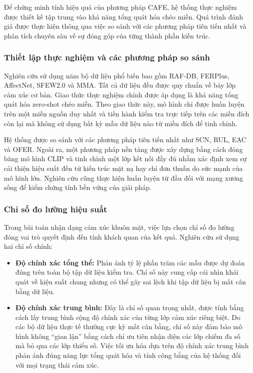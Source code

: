 Để chứng minh tính hiệu quả của phương pháp CAFE, hệ thống thực nghiệm được thiết kế tập trung vào khả năng tổng quát hóa chéo miền. Quá trình đánh giá được thực hiện thông qua việc so sánh với các phương pháp tiên tiến nhất và phân tích chuyên sâu về sự đóng góp của từng thành phần kiến trúc.

\subsubsection{Thiết lập thực nghiệm và các phương pháp so sánh}

Nghiên cứu sử dụng năm bộ dữ liệu phổ biến bao gồm RAF-DB, FERPlus, AffectNet, SFEW2.0 và MMA. Tất cả dữ liệu đều được quy chuẩn về bảy lớp cảm xúc cơ bản. Giao thức thực nghiệm chính được áp dụng là khả năng tổng quát hóa zero-shot chéo miền. Theo giao thức này, mô hình chỉ được huấn luyện trên một miền nguồn duy nhất và tiến hành kiểm tra trực tiếp trên các miền đích còn lại mà không sử dụng bất kỳ mẫu dữ liệu nào từ miền đích để tinh chỉnh.

Hệ thống được so sánh với các phương pháp tiên tiến nhất như SCN, RUL, EAC và OFER. Ngoài ra, một phương pháp nền tảng được xây dựng bằng cách đóng băng mô hình CLIP và tinh chỉnh một lớp kết nối đầy đủ nhằm xác định xem sự cải thiện hiệu suất đến từ kiến trúc mặt nạ hay chỉ đơn thuần do sức mạnh của mô hình lớn. Nghiên cứu cũng thực hiện huấn luyện từ đầu đối với mạng xương sống để kiểm chứng tính bền vững của giải pháp.

\subsubsection{Chỉ số đo lường hiệu suất}

Trong bài toán nhận dạng cảm xúc khuôn mặt, việc lựa chọn chỉ số đo lường đóng vai trò quyết định đến tính khách quan của kết quả. Nghiên cứu sử dụng hai chỉ số chính:

\begin{itemize}
    \item \textbf{Độ chính xác tổng thể:} Phản ánh tỷ lệ phần trăm các mẫu được dự đoán đúng trên toàn bộ tập dữ liệu kiểm tra. Chỉ số này cung cấp cái nhìn khái quát về hiệu suất chung nhưng có thể gây sai lệch khi tập dữ liệu bị mất cân bằng dữ liệu.
    \item \textbf{Độ chính xác trung bình:} Đây là chỉ số quan trọng nhất, được tính bằng cách lấy trung bình cộng độ chính xác của từng lớp cảm xúc riêng biệt. Do các bộ dữ liệu thực tế thường cực kỳ mất cân bằng, chỉ số này đảm bảo mô hình không ``gian lận'' bằng cách chỉ ưu tiên nhận diện các lớp chiếm đa số mà bỏ qua các lớp thiểu số. Việc tối ưu hóa dựa trên độ chính xác trung bình phản ánh đúng năng lực tổng quát hóa và tính công bằng của hệ thống đối với mọi trạng thái cảm xúc.
\end{itemize}

